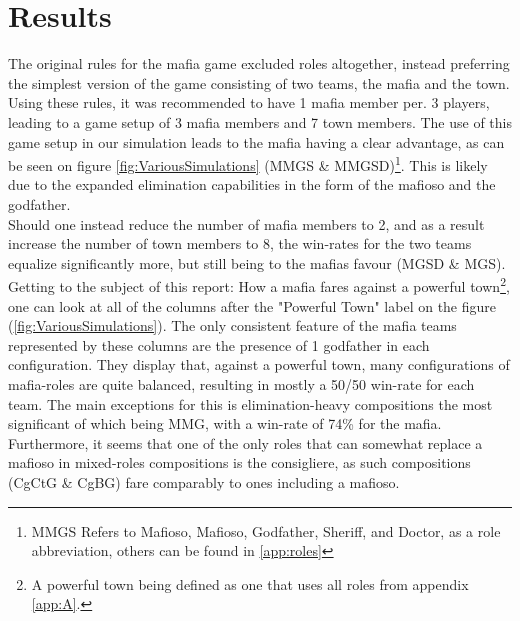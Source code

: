 \section{Results}\label{sec:results}
The original rules for the mafia game excluded roles altogether, instead
preferring the simplest version of the game consisting of two teams, the mafia
and the town. Using these rules\cite{MafiaRules}, it was recommended to have 1
mafia member per. 3 players, leading to a game setup of 3 mafia members and 7
town members. The use of this game setup in our simulation leads to the mafia
having a clear advantage, as can be seen on figure \ref{fig:VariousSimulations}
(MMGS \& MMGSD)\footnote{MMGS Refers to Mafioso, Mafioso, Godfather, Sheriff,
    and Doctor, as a role abbreviation, others can be found in \ref{app:roles}}.
This is likely due to the expanded elimination capabilities in the form of the
mafioso and the godfather. \\ Should one instead reduce the number of mafia
members to 2, and as a result increase the number of town members to 8, the
win-rates for the two teams equalize significantly more, but still being to the
mafias favour (MGSD \& MGS).\\ Getting to the subject of this report: How a
mafia fares against a powerful town\footnote{A powerful town being defined as
    one that uses all roles from appendix \ref{app:A}.}, one can look at all of the
columns after the "Powerful Town" label on the figure
(\ref{fig:VariousSimulations}). The only consistent feature of the mafia teams
represented by these columns are the presence of 1 godfather in each configuration. They
display that, against a powerful town, many configurations of mafia-roles are
quite balanced, resulting in mostly a 50/50 win-rate for each team. The main
exceptions for this is elimination-heavy compositions the most significant of
which being MMG, with a win-rate of 74\% for the mafia. Furthermore, it seems
that one of the only roles that can somewhat replace a mafioso in mixed-roles
compositions is the consigliere, as such compositions (CgCtG \& CgBG) fare
comparably to ones including a mafioso. \\ 
